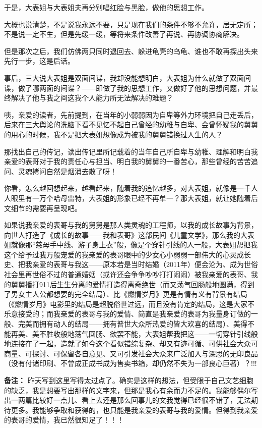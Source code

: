 \documentclass[9pt, b5paper]{article}
\begin{document}
于是，大表姐与大表姐夫再分别唱红脸与黑脸，做他的思想工作。

大概也说清楚，不是说我永远不要，只是现在我们的条件不够不允许，居无定所；不是说一定不生，但是先缓一缓，等将来条件改善了再说、再协调协商解决。

但是那次之后，我们仿佛两只同时退回去、躲进龟壳的乌龟、谁也不敢再探出头来先行一步，这是后话。 

事后，三大说大表姐是双面间谍，我却没能想明白，大表姐为什么就做了双面间谍，做了哪两面的间谍？——即做了我的思想工作，又做好了他的思想问题，并最终解决了他与我之间这我个人能力所无法解决的难题？

咦，亲爱的读者，先前提到，在当年的小弱弱因为自卑等外力环境把自己走丢后，后来在三大舆论的洗脑下看不见忆不起自己曾经的幼稚与自卑、会曾怀疑我的舅舅的用心的时候，我不是把大表姐想像成为被我的舅舅错换过人生的人？

那找出自己的传记，读出传记里所记载着的当年自己所自卑与幼稚、理解和明白我亲爱的表哥对于我的责任心与担当、明白我的舅舅的一番苦心，那些曾经的苦苦追问、灵魂拷问自然是烟消去散了呀！

你看，怎么越回想起来，越看起来，随着我的追忆越多，对大表姐，就像是一千人人眼里有一万个哈母雷特，大表姐的形象已经不再单一？那大表姐，就让她随着后文细节的需要再呈现吧。

如果说我亲爱的表哥与我的舅舅是那人类灵魂的工程师，以我的成长故事为背景，向世人打造了《成长的故事——我和表哥》这部民间《儿童文学》，那么我的大表姐就像那“慈母手中线、游子身上衣”般，像是个穿针引线的人一般，大表姐帮把我这个给予过我万般宠爱的我亲爱的表哥眼中的少女心小弱弱一部伟大的心灵成长史、把我亲爱的表哥与我这——原本若是当时结婚（2011年）便会沦为、成为世俗社会里再世俗不过的普通婚姻（或许还会争争吵吵打打闹闹）被我亲爱的表哥、我的舅舅播打911后生生分离的爱情打造得离奇绝世（而又荡气回肠般地圆满，得到了男女主人公都想要的完全结局）、比《燃情岁月》更是有情有义有背景有结局（《燃情岁月》电影里的结局是超脱俗世过远，而且没有肯定的结局，这是大家不乐意接受的；而我亲爱的表哥与我的爱情、简直是我亲爱的表哥为我量身订做的一般、完美而拥有动人的结局——拥有普世大众所热爱的皆大欢喜的结局）、美得不能再美、美不胜收般地荡气回肠、欲罢不能，大表姐帮我把这——一切穿针引线般地连接在了一起，造就了如今这个看似错综复杂、却又有迹可循、可供社会大众可商量、可探讨、可保留各自意见、又可引发社会大众来广泛加入与深思的无印良品（没有付诸印刷、不曾成正成书成为售卖书箱，却仍然不失为一部良心巨著）？!!!

\textbf{备注：} 昨天写到这里写得太过点了。确实是这样的想法，但受限于自己文艺细胞的缺乏，我是想要写出那样的文字来，但那是我心有余而力不足的。我能够偶尔写出一两篇比较好一点儿、看上去还是那么回事儿的文我觉得已经很不错了，无法期待更多。我能够争取和获得的，也只能是我亲爱的表哥与我的爱情。但得到我亲爱的表哥的爱情，我已然很知足了！！！
\end{document}
